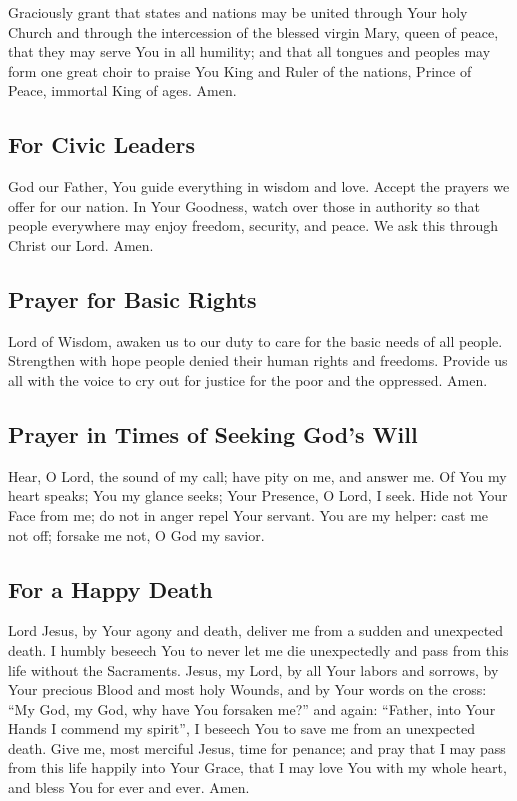 \documentclass[12pt]{article}
\newcommand{\prayertitle}[1]{\subsection{#1}}
\begin{document}
Graciously grant that states and nations may be united through Your holy Church and through the intercession of the blessed virgin Mary, queen of peace, that they may serve You in all humility;
and that all tongues and peoples may form one great choir to praise You King and Ruler of the nations, Prince of Peace, immortal King of ages.
Amen.

\prayertitle{For Civic Leaders}
God our Father, You guide everything in wisdom and love.
Accept the prayers we offer for our nation.
In Your Goodness, watch over those in authority so that people everywhere may enjoy freedom, security, and peace.
We ask this through Christ our Lord.
Amen.

\prayertitle{Prayer for Basic Rights}
Lord of Wisdom, awaken us to our duty to care for the basic needs of all people.
Strengthen with hope people denied their human rights and freedoms.
Provide us all with the voice to cry out for justice for the poor and the oppressed.
Amen.

\prayertitle{Prayer in Times of Seeking God's Will}
Hear, O Lord, the sound of my call;
have pity on me, and answer me.
Of You my heart speaks;
You my glance seeks;
Your Presence, O Lord, I seek.
Hide not Your Face from me; 
do not in anger repel Your servant.
You are my helper: cast me not off;
forsake me not, O God my savior.

\prayertitle{For a Happy Death}
Lord Jesus, by Your agony and death, deliver me from a sudden and unexpected death.
I humbly beseech You to never let me die unexpectedly and pass from this life without the Sacraments.
Jesus, my Lord, by all Your labors and sorrows, by Your precious Blood and most holy Wounds, and by Your words on the cross:
``My God, my God, why have You forsaken me?''
and again:
``Father, into Your Hands I commend my spirit'',
I beseech You to save me from an unexpected death.
Give me, most merciful Jesus, time for penance;
and pray that I may pass from this life happily into Your Grace, that I may love You with my whole heart, and bless You for ever and ever.
Amen.
\end{document}
